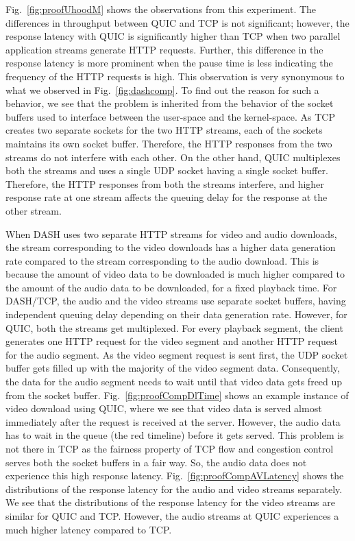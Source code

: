 Fig.~\ref{fig:proofUhoodM} shows the observations from this experiment. The differences in throughput between QUIC and TCP is not significant; however, the response latency with QUIC is significantly higher than TCP when two parallel application streams generate HTTP requests. Further, this difference in the response latency is more prominent when the pause time is less indicating the frequency of the HTTP requests is high. This observation is very synonymous to what we observed in Fig.~\ref{fig:dashcomp}. To find out the reason for such a behavior, we see that the problem is inherited from the behavior of the socket buffers used to interface between the user-space and the kernel-space. As TCP creates two separate sockets for the two HTTP streams, each of the sockets maintains its own socket buffer. Therefore, the HTTP responses from the two streams do not interfere with each other. On the other hand, QUIC multiplexes both the streams and uses a single UDP socket having a single socket buffer. Therefore, the HTTP responses from both the streams interfere, and higher response rate at one stream affects the queuing delay for the response at the other stream. 


When DASH uses two separate HTTP streams for video and audio downloads, the stream corresponding to the video downloads has a higher data generation rate compared to the stream corresponding to the audio download. This is because the amount of video data to be downloaded is much higher compared to the amount of the audio data to be downloaded, for a fixed playback time. For DASH/TCP, the audio and the video streams use separate socket buffers, having independent queuing delay depending on their data generation rate. However, for QUIC, both the streams get multiplexed. For every playback segment, the client generates one HTTP request for the video segment and another HTTP request for the audio segment. As the video segment request is sent first, the UDP socket buffer gets filled up with the majority of the video segment data. Consequently, the data for the audio segment needs to wait until that video data gets freed up from the socket buffer. Fig.~\ref{fig:proofCompDlTime} shows an example instance of video download using QUIC, where we see that video data is served almost immediately after the request is received at the server. However, the audio data has to wait in the queue (the red timeline) before it gets served. This problem is not there in TCP as the fairness property of TCP flow and congestion control serves both the socket buffers in a fair way. So, the audio data does not experience this high response latency. Fig.~\ref{fig:proofCompAVLatency} shows the distributions of the response latency for the audio and video streams separately. We see that the distributions of the response latency for the video streams are similar for QUIC and TCP. However, the audio streams at QUIC experiences a much higher latency compared to TCP. 



